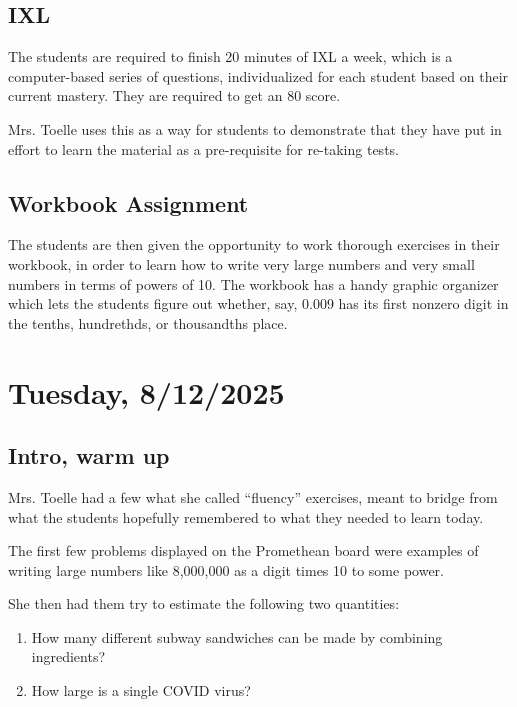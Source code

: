 \documentclass[11pt]{elegantbook}
\begin{document}
\section*{IXL}

The students are required to finish 20 minutes of IXL a week, which is
a computer-based series of questions, individualized for each student
based on their current mastery.  They are required to get an 80%
score.

Mrs. Toelle uses this as a way for students to demonstrate that they have
put in effort to learn the material as a pre-requisite for re-taking tests.

\section*{Workbook Assignment}

The students are then given the opportunity to work thorough exercises
in their workbook, in order to learn how to write very large numbers
and very small numbers in terms of powers of 10.  The workbook has a
handy graphic organizer which lets the students figure out whether, 
say, 0.009 has its first nonzero digit in the tenths, hundrethds, or
thousandths place.



\chapter{Tuesday, 8/12/2025}

\section*{Intro, warm up}

Mrs. Toelle had a few what she called ``fluency'' exercises, meant to
bridge from what the students hopefully remembered to what they needed
to learn today.

The first few problems displayed on the Promethean board were examples
of writing large numbers like 8,000,000 as a digit times 10 to some
power.

She then had them try to estimate the following two quantities:
\begin{enumerate}
\item How many different subway sandwiches can be made by combining
  ingredients?
\item How large is a single COVID virus?
\end{enumerate}
\end{document}
